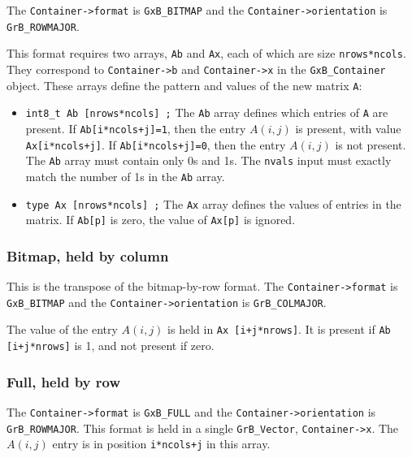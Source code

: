 The \verb'Container->format' is \verb'GxB_BITMAP' and the
\verb'Container->orientation' is \verb'GrB_ROWMAJOR'.

This format requires two arrays, \verb'Ab' and \verb'Ax', each of which are
size \verb'nrows*ncols'.  They correspond to \verb'Container->b' and
\verb'Container->x' in the \verb'GxB_Container' object.  These arrays define
the pattern and values of the new matrix \verb'A':

\begin{itemize}
\item \verb'int8_t Ab [nrows*ncols] ;'  The \verb'Ab' array defines which
entries of \verb'A' are present.  If \verb'Ab[i*ncols+j]=1', then the entry
$A(i,j)$ is present, with value \verb'Ax[i*ncols+j]'.  If
\verb'Ab[i*ncols+j]=0', then the entry $A(i,j)$ is not present.  The \verb'Ab'
array must contain only 0s and 1s.  The \verb'nvals' input must exactly match
the number of 1s in the \verb'Ab' array.

\item \verb'type Ax [nrows*ncols] ;'  The \verb'Ax' array defines the values of
entries in the matrix.  If \verb'Ab[p]' is zero, the value of \verb'Ax[p]' is
ignored.
\end{itemize}

\subsubsection{Bitmap, held by column}
\label{format_bitmap_by_col}

This is the transpose of the bitmap-by-row format.
The \verb'Container->format' is \verb'GxB_BITMAP' and the
\verb'Container->orientation' is \verb'GrB_COLMAJOR'.

The value of the entry $A(i,j)$ is held in \verb'Ax [i+j*nrows]'.
It is present if \verb'Ab [i+j*nrows]' is 1, and not present if zero.

\subsubsection{Full, held by row}
\label{format_full_by_row}

The \verb'Container->format' is \verb'GxB_FULL' and the
\verb'Container->orientation' is \verb'GrB_ROWMAJOR'.  This format is held in a
single \verb'GrB_Vector', \verb'Container->x'.  The $A(i,j)$ entry is in
position \verb'i*ncols+j' in this array.

